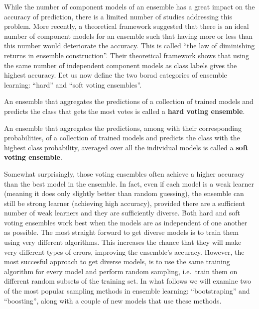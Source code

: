 While the number of component models of an ensemble has a great impact on the accuracy of prediction, there is a
limited number of studies addressing this problem. More recently, a theoretical framework suggested that there is an
ideal number of component models for an ensemble such that having more or less than this number  would deteriorate
the accuracy. This is called ``the law of diminishing returns in ensemble construction''. Their theoretical
framework shows that using the same number of independent component models as class labels gives the highest
accuracy. \v

Let us now define the two borad categories of ensemble learning: ``hard'' and ``soft voting ensembles''.

An ensemble that aggregates the predictions of a collection of trained models and predicts the class that gets the most
votes is called a \textbf{hard voting ensemble}.
\ed

An ensemble that aggregates the predictions, among with their corresponding probabilities, of a collection of trained
models and predicts the class with the highest class probability, averaged over all the individual models is called a
\textbf{soft voting ensemble}.
\ed


Somewhat surprisingly, those voting ensembles often achieve a higher accuracy than the best model in the ensemble.
In fact, even if each model is a weak learner (meaning it does only slightly better than random guessing), the
ensemble can still be strong learner (achieving high accuracy), provided there are a sufficient number of weak
learners and they are sufficiently diverse. \v

Both hard and soft voting ensembles work best when the models are as independent of one another as possible. The
most straight forward to get diverse models is to train them using very different algorithms. This increases the
chance that they will make very different types of errors, improving the ensemble's accuracy. \v

However, the most succesful approach to get diverse models, is to use the same training algorithm for every model
and perform random sampling, i.e.\ train them on different random subsets of the training set. In what follows we will
examine two of the most popular sampling methods in ensemble learning: ``bootstraping'' and ``boosting'', along with
a couple of new models that use these methods.

